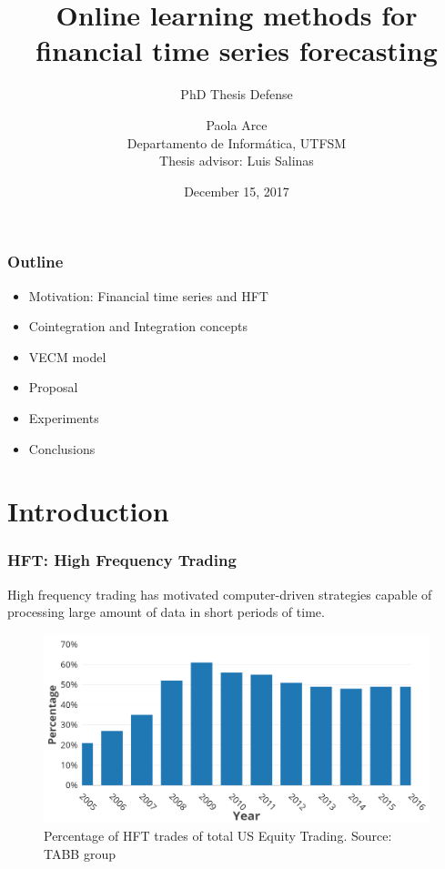 \documentclass{beamer}
\author[Paola Arce]{Paola Arce \\ Departamento de Inform\'atica, UTFSM \\ Thesis advisor: Luis Salinas}
\date{December 15, 2017}
\title[Thesis defense]{Online learning methods for financial time series forecasting}
\subtitle{PhD Thesis Defense}
\begin{document}
\begin{frame}[plain]
\titlepage
\end{frame}

\begin{frame}
\frametitle{Outline}
\begin{itemize}
\item Motivation: Financial time series and HFT
\item Cointegration and Integration concepts
\item VECM model
\item Proposal
\item Experiments
\item Conclusions
\end{itemize}
\end{frame}

\section{Introduction}

\begin{frame}
\frametitle{HFT: High Frequency Trading}
High frequency trading has motivated computer-driven strategies capable of processing large amount of data in short periods of time.
\begin{figure}
\includegraphics[width=0.7\paperwidth]{img/HFTmarket}
\caption{Percentage of HFT trades of total US Equity Trading. Source: TABB group}
\end{figure}
\end{frame}
\end{document}
